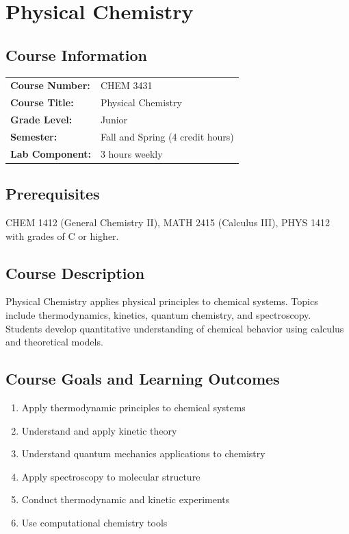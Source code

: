\documentclass[12pt,oneside]{book}
\begin{document}

\chapter{Physical Chemistry}

\section{Course Information}

\begin{tabular}{ll}
\textbf{Course Number:} & CHEM 3431 \\
\textbf{Course Title:} & Physical Chemistry \\
\textbf{Grade Level:} & Junior \\
\textbf{Semester:} & Fall and Spring (4 credit hours) \\
\textbf{Lab Component:} & 3 hours weekly \\
\end{tabular}

\section{Prerequisites}

CHEM 1412 (General Chemistry II), MATH 2415 (Calculus III), PHYS 1412 with grades of C or higher.

\section{Course Description}

Physical Chemistry applies physical principles to chemical systems. Topics include thermodynamics, kinetics, quantum chemistry, and spectroscopy. Students develop quantitative understanding of chemical behavior using calculus and theoretical models.

\section{Course Goals and Learning Outcomes}

\begin{enumerate}
    \item Apply thermodynamic principles to chemical systems
    \item Understand and apply kinetic theory
    \item Understand quantum mechanics applications to chemistry
    \item Apply spectroscopy to molecular structure
    \item Conduct thermodynamic and kinetic experiments
    \item Use computational chemistry tools
\end{enumerate}
\end{document}
